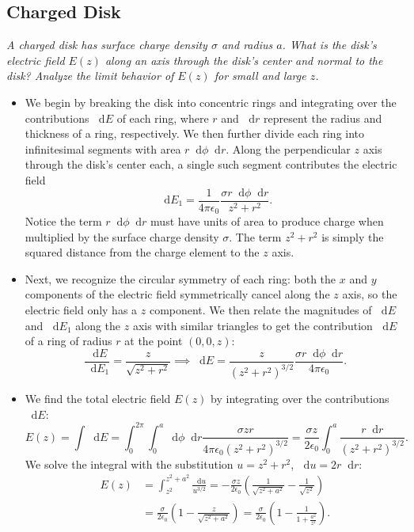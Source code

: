 \documentclass[11pt, a4paper]{article}
\newcommand{\diff}{\mathop{}\!\mathrm{d}} %
\newcommand{\ee}{\epsilon_{0}}  %
\begin{document}
\subsection{Charged Disk}
\textit{A charged disk has surface charge density $ \sigma $ and radius $ a $. What is the disk's electric field $ E(z) $ along an axis through the disk's center and normal to the disk? Analyze the limit behavior of $ E(z) $ for small and large $ z $.}
\begin{itemize}
	\item We begin by breaking the disk into concentric rings and integrating over the contributions $ \diff E $ of each ring, where $ r $ and $ \diff r $ represent the radius and thickness of a ring, respectively. We then further divide each ring into infinitesimal segments with area $ r \diff \phi \diff r $. Along the perpendicular $ z $ axis through the disk's center each, a single such segment contributes the electric field
	\begin{equation*}
		\diff E_{1} = \frac{1}{4\pi \ee} \frac{\sigma r\diff \phi \diff r }{z^{2} + r^{2}}.
	\end{equation*}
	Notice the term $ r\diff \phi \diff r $ must have units of area to produce charge when multiplied by the surface charge density $ \sigma $. The term $ z^{2} + r^{2} $ is simply the squared distance from the charge element to the $ z $ axis.
	
	\item Next, we recognize the circular symmetry of each ring: both the $ x $ and $ y $ components of the electric field symmetrically cancel along the $ z $ axis, so the electric field only has a $ z $ component. We then relate the magnitudes of $ \diff E $ and $ \diff E_{1} $ along the $ z $ axis with similar triangles to get the contribution $ \diff E $ of a ring of radius $ r $ at the point $ (0, 0, z) $:
	\begin{equation*}
		\frac{\diff E}{\diff E_{1}} = \frac{z}{\sqrt{z^{2} + r^{2}}} \implies  \diff E = \frac{z}{(z^{2} + r^{2})^{3/2}} \frac{\sigma r\diff \phi \diff r }{4\pi \ee}.
	\end{equation*}
	
    \item We find the total electric field $ E(z) $ by integrating over the contributions $ \diff E $:
	\begin{equation*}
		E(z) = \int \diff E = \int_{0}^{2\pi}\int_{0}^{a}\diff \phi \diff r \frac{\sigma z r}{4\pi \ee (z^{2} + r^{2})^{3/2}} = \frac{\sigma z}{2\ee} \int_{0}^{a}\frac{r \diff r}{(z^{2} + r^{2})^{3/2}}.
	\end{equation*}
	We solve the integral with the substitution $ u = z^{2} + r^{2} $, $\diff u = 2r \diff r $:
	\begin{align*}
		E(z) &= \int_{z^{2}}^{z^{2} + a^{2}} \frac{\diff u}{u^{3/2}} = -\frac{\sigma z}{2 \ee} \left(\frac{1}{\sqrt{z^{2} + a^{2}}} - \frac{1}{\sqrt{z^{2}}}\right)\\
		&=\frac{\sigma}{2\ee} \left(1 - \frac{z}{\sqrt{z^{2} + a^{2}}}\right) = \frac{\sigma}{2\ee} \left(1 - \frac{1}{1 + \frac{a^{2}}{z^{2}}}\right).
	\end{align*}
	

\end{itemize}
\end{document}
